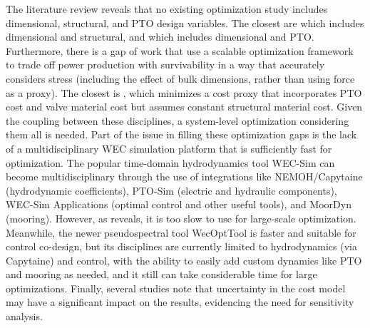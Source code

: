 The literature review reveals that no existing optimization study includes dimensional, structural, and PTO design variables. The closest are \cite{ambuhl_reliability-based_2014} which includes dimensional and structural, and \cite{grasberger_control_2024} which includes dimensional and PTO. Furthermore, there is a gap of work that use a scalable optimization framework to trade off power production with survivability in a way that accurately considers stress (including the effect of bulk dimensions, rather than using force as a proxy). The closest is \cite{rosati_control_2023}, which minimizes a cost proxy that incorporates PTO cost and valve material cost but assumes constant structural material cost. Given the coupling between these disciplines, a system-level optimization considering them all is needed. Part of the issue in filling these optimization gaps is the lack of a multidisciplinary WEC simulation platform that is sufficiently fast for optimization. The popular time-domain hydrodynamics tool WEC-Sim \cite{ruehl_wec-simwec-sim_2024} can become multidisciplinary through the use of integrations like NEMOH/Capytaine (hydrodynamic coefficients), PTO-Sim (electric and hydraulic components), WEC-Sim Applications (optimal control and other useful tools), and MoorDyn (mooring). However, as \cite{housner_numerical_2024} reveals, it is too slow to use for large-scale optimization. Meanwhile, the newer pseudospectral tool WecOptTool \cite{coe_initial_2020} is faster and suitable for control co-design, but its disciplines are currently limited to hydrodynamics (via Capytaine) and control, with the ability to easily add custom dynamics like PTO and mooring as needed, and it still can take considerable time for large optimizations. Finally, several studies note that uncertainty in the cost model may have a significant impact on the results, evidencing the need for sensitivity analysis.

